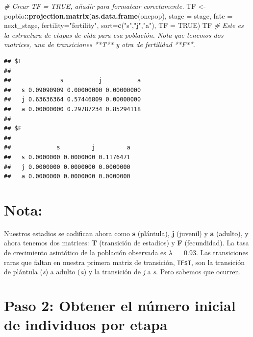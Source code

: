\documentclass[
]{book}
\newenvironment{Shaded}{\begin{snugshade}}{\end{snugshade}}
\newcommand{\AttributeTok}[1]{\textcolor[rgb]{0.13,0.29,0.53}{#1}}
\newcommand{\CommentTok}[1]{\textcolor[rgb]{0.56,0.35,0.01}{\textit{#1}}}
\newcommand{\ConstantTok}[1]{\textcolor[rgb]{0.56,0.35,0.01}{#1}}
\newcommand{\FunctionTok}[1]{\textcolor[rgb]{0.13,0.29,0.53}{\textbf{#1}}}
\newcommand{\NormalTok}[1]{#1}
\newcommand{\OtherTok}[1]{\textcolor[rgb]{0.56,0.35,0.01}{#1}}
\newcommand{\SpecialCharTok}[1]{\textcolor[rgb]{0.81,0.36,0.00}{\textbf{#1}}}
\newcommand{\StringTok}[1]{\textcolor[rgb]{0.31,0.60,0.02}{#1}}
\theoremstyle{definition}
\theoremstyle{definition}
\theoremstyle{definition}
\theoremstyle{definition}
\theoremstyle{remark}
\begin{document}
\begin{Shaded}
\begin{Highlighting}[]
\CommentTok{\# Crear TF = TRUE, añadir para formatear corectamente.}
\NormalTok{TF }\OtherTok{\textless{}{-}}\NormalTok{ popbio}\SpecialCharTok{::}\FunctionTok{projection.matrix}\NormalTok{(}\FunctionTok{as.data.frame}\NormalTok{(onepop), }
                        \AttributeTok{stage =}\NormalTok{ stage, }\AttributeTok{fate =}\NormalTok{ next\_stage, }
                        \AttributeTok{fertility=}\StringTok{"fertility"}\NormalTok{, }\AttributeTok{sort=}\FunctionTok{c}\NormalTok{(}\StringTok{"s"}\NormalTok{,}\StringTok{"j"}\NormalTok{,}\StringTok{"a"}\NormalTok{), }\AttributeTok{TF =} \ConstantTok{TRUE}\NormalTok{)}
\NormalTok{TF }\CommentTok{\# Este es la estructura de etapas de vida para esa población.  Nota que tenemos dos matrices, una de transiciones **T** y otra de fertilidad **F**. }
\end{Highlighting}
\end{Shaded}

\begin{verbatim}
## $T
##    
##              s          j          a
##   s 0.09090909 0.00000000 0.00000000
##   j 0.63636364 0.57446809 0.00000000
##   a 0.00000000 0.29787234 0.85294118
## 
## $F
##    
##             s         j         a
##   s 0.0000000 0.0000000 0.1176471
##   j 0.0000000 0.0000000 0.0000000
##   a 0.0000000 0.0000000 0.0000000
\end{verbatim}

\section{Nota:}\label{nota}

Nuestros estadios se codifican ahora como \textbf{s} (plántula), \textbf{j} (juvenil) y \textbf{a} (adulto), y ahora tenemos dos matrices: \textbf{T} (transición de estadios) y \textbf{F} (fecundidad). La tasa de crecimiento asintótico de la población observada es \(\lambda =\) 0.93. Las transiciones raras que faltan en nuestra primera matriz de transición, \texttt{TF\$T}, son la transición de plántula (\emph{s}) a adulto (\emph{a}) y la transición de \emph{j} a
\emph{s}. Pero sabemos que ocurren.

\section{Paso 2: Obtener el número inicial de individuos por etapa}\label{paso-2-obtener-el-nuxfamero-inicial-de-individuos-por-etapa}
\end{document}
